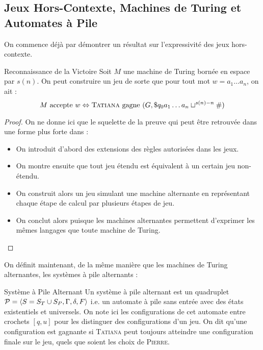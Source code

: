 \documentclass{cours}
\begin{document}
\subsection{Jeux Hors-Contexte, Machines de Turing et Automates à Pile}
On commence déjà par démontrer un résultat sur l'expressivité des jeux hors-contexte. 
\begin{théorème}{Reconnaissance de la Victoire}{}
    Soit $M$ une machine de Turing bornée en espace par $s(n)$. On peut construire un jeu de sorte que pour tout mot $w = a_{1}\ldots a_{n}$, on ait : 
    \[
        M \text{ accepte } w \Leftrightarrow \textsc{Tatiana} \text{ gagne } (G, \$q_{0}a_{1}\ldots a_{n}\sqcup^{s(n) - n}\#)  
    \]
\end{théorème}
\begin{proof}
    On ne donne ici que le squelette de la preuve qui peut être retrouvée dans une forme plus forte dans \cite{cfgames} : 
    \begin{itemize}
        \item On introduit d'abord des extensions des règles autorisées dans les jeux.
        \item On montre ensuite que tout jeu étendu est équivalent à un certain jeu non-étendu. 
        \item On construit alors un jeu simulant une machine alternante en représentant chaque étape de calcul par plusieurs étapes de jeu. 
        \item On conclut alors puisque les machines alternantes permettent d'exprimer les mêmes langages que toute machine de Turing. 
    \end{itemize}
\end{proof}

On définit maintenant, de la même manière que les machines de Turing alternantes, les systèmes à pile alternants : 
\begin{définition}{Système à Pile Alternant}{}
    Un système à pile alternant est un quadruplet $\mathcal{P} = \left\langle S = S_{T} \cup S_{P}, \Gamma, \delta, F \right\rangle$ i.e. un automate à pile sans entrée avec des états existentiels et universels. On note ici les configurations de cet automate entre crochets $\left[q, u\right]$ pour les distinguer des configurations d'un jeu. On dit qu'une configuration est gagnante si \textsc{Tatiana} peut toujours atteindre une configuration finale sur le jeu, quels que soient les choix de \textsc{Pierre}.
\end{définition}
\end{document}
